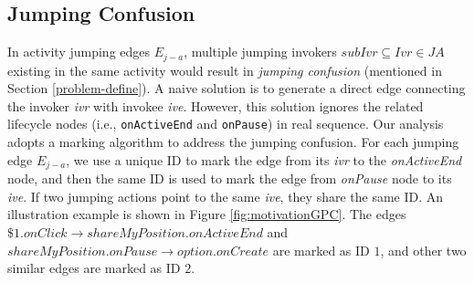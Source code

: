 


\subsection{Jumping Confusion}\label{jumpConfusion}
In activity jumping edges $E_{j-a}$, multiple jumping invokers $subIvr\subseteq Ivr\in JA$  existing in the same activity would result in \textit{jumping confusion} (mentioned in Section \ref{problem-define}). A naive solution is to generate a direct edge connecting the invoker \textit{ivr} with invokee \textit{ive}. However, this solution ignores the related lifecycle nodes (i.e., \texttt{onActiveEnd} and \texttt{onPause}) in real sequence. Our analysis adopts a marking algorithm to address the jumping confusion. For each jumping edge $E_{j-a}$, we use a unique ID to mark the edge from its \textit{ivr} to the \textit{onActiveEnd} node, and then the same ID is used to mark the edge from \textit{onPause} node to its \textit{ive}. If two jumping actions point to the same \textit{ive}, they share the same ID. An illustration example is shown in Figure \ref{fig:motivationGPC}. The edges $\$1.onClick\rightarrow shareMyPosition.onActiveEnd$ and $shareMyPosition.onPause\rightarrow option.onCreate$ are marked as ID $1$, and other two similar edges are marked as ID $2$.

